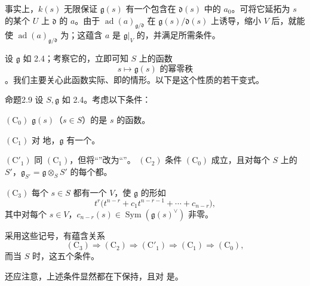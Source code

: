 事实上，$k(s)$ 无限保证 $\mathfrak g(s)$ 有一个包含在 $\mathfrak d(s)$ 中的 $a_0$。可将它延拓为 $s$ 的某个 $U$ 上 $\mathfrak d$ 的 $a$。由于 $\operatorname{ad}(a)_{\mathfrak g/\mathfrak d}$ 在 $\mathfrak g(s)/\mathfrak d(s)$ 上诱导，缩小 $V$ 后，就能使 $\operatorname{ad}(a)_{\mathfrak g/\mathfrak d}$ 为；这蕴含 $a$ 是 $\mathfrak g|_V$ 的，并满足所需条件。

设 $\mathfrak g$ 如 2.4；考察它的，立即可知 $S$ 上的函数
\[s\longmapsto\mathfrak g(s)\text{ 的幂零秩}\]
。我们主要关心此函数实际、即的情形。以下是这个性质的若干变式。
\begin{SGAresult}{命题}{2.9}
设 $S,\mathfrak g$ 如 2.4。考虑以下条件：

$(\mathrm C_0)$ $\mathfrak g(s)$（$s\in S$）的是 $s$ 的函数。

$(\mathrm C_1)$ 对 地，$\mathfrak g$ 有一个。

$(\mathrm C'_1)$ 同 $(\mathrm C_1)$，但将“”改为“”。
$(\mathrm C_2)$ 条件 $(\mathrm C_0)$ 成立，且对每个 $S$ 上的 $S'$，$\mathfrak g_{S'}=\mathfrak g\otimes_S S'$ 的每个都。

$(\mathrm C_3)$ 每个 $s\in S$ 都有一个 $V$，使 $\mathfrak g$ 的形如
\[t^r\bigl(t^{n-r}+c_1t^{n-r-1}+\cdots+c_{n-r}\bigr),\]
其中对每个 $s\in V$，$c_{n-r}(s)\in\operatorname{Sym}(\mathfrak g(s)^\vee)$ 非零。

采用这些记号，有蕴含关系
\[(\mathrm C_3)\Rightarrow(\mathrm C_2)\Rightarrow(\mathrm C'_1)
\Rightarrow(\mathrm C_1)\Rightarrow(\mathrm C_0),\]
而当 $S$ 时，这五个条件。
\end{SGAresult}
还应注意，上述条件显然都在下保持，且对 是。

